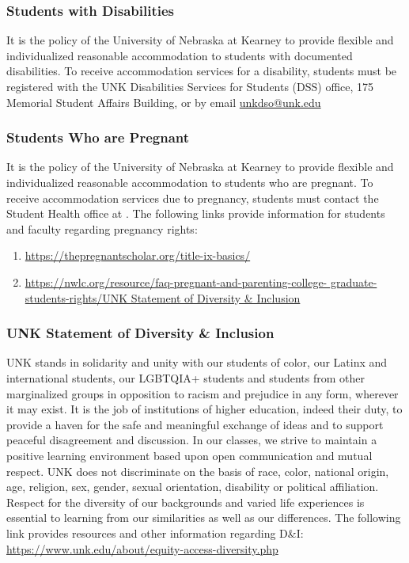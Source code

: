 \documentclass[12pt]{article}
\newcounter{ex}\setcounter{ex}{0}
\begin{document}
\subsubsection*{Students with Disabilities}

It is the policy of the University of Nebraska at Kearney to provide flexible and individualized reasonable accommodation to students with documented disabilities. To receive accommodation services for a disability, students must be registered with the UNK Disabilities Services for Students (DSS) office, 175 Memorial Student 
Affairs Building,   or by 
email \href{mailto:unkdso@unk.edu}{unkdso@unk.edu}

\subsubsection*{Students Who are Pregnant}

It is the policy of the University of Nebraska at Kearney to provide flexible 
and individualized reasonable accommodation to students who are pregnant. 
To receive accommodation services due to pregnancy, students must contact 
the Student Health office at . The following 
links provide information for students and faculty regarding pregnancy 
rights:
\small
\begin{enumerate}
  \item \url{https://thepregnantscholar.org/title-ix-basics/}
  \item \url{https://nwlc.org/resource/faq-pregnant-and-parenting-college-
  graduate-students-rights/UNK Statement of Diversity & Inclusion}
\end{enumerate}
\normalsize

\subsubsection*{UNK Statement of Diversity \& Inclusion}

UNK stands in solidarity and unity with our students of color, our Latinx and international students, our LGBTQIA+ students 
and students from other marginalized groups in opposition to racism 
and prejudice in any form, wherever it may exist. It is the job of 
institutions of higher education, indeed their duty, to provide a 
haven for the safe and meaningful exchange of ideas and to support 
peaceful disagreement and discussion. In our classes, we strive to 
maintain a positive learning environment based upon open 
communication and mutual respect. UNK does not discriminate on the 
basis of race, color, national origin, age, religion, sex, gender, 
sexual orientation, disability or political affiliation. 
Respect for the diversity of our backgrounds and varied life 
experiences is essential to learning from our similarities as well 
as our differences. The following link provides resources and other 
information regarding D\&I: \url{https://www.unk.edu/about/equity-access-diversity.php}



\end{document}
